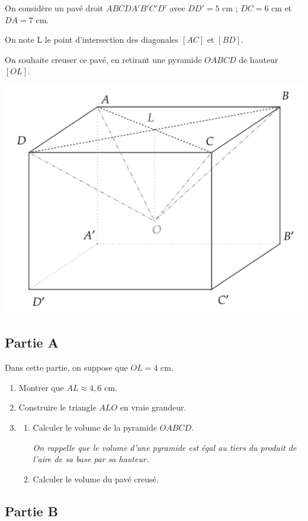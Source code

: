 On considère un pavé droit $ABCDA'B'C'D'$ avec $DD'= 5$ cm ; $DC= 6$ cm et $DA = 7$ cm.

On note L le point d’intersection des diagonales $[AC]$ et $[BD]$.

On souhaite creuser ce pavé, en retirant une pyramide $OABCD$ de hauteur $[OL]$.


\begin{center}
	\includegraphics[width=.5\textwidth]{./images/2022-g2-ex3-img1.png}
\end{center}

\subsection*{Partie A}
Dans cette partie, on suppose que $OL=4$ cm.
\begin{enumerate}
\item Montrer que $AL\approx4,6$ cm.
\item Construire le triangle $ALO$ en vraie grandeur.
\item 
\begin{enumerate}
	\item Calculer le volume de la pyramide $OABCD$.
	
\textit{On rappelle que le volume d’une pyramide est égal au tiers du produit de l’aire de sa base par sa hauteur.}

\item Calculer le volume du pavé creusé.
\end{enumerate}
\end{enumerate}

\subsection*{Partie B}

